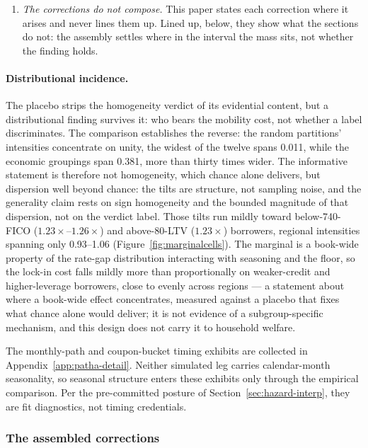 \begin{enumerate}
\item \emph{The corrections do not compose.} This paper states each correction where it arises and never lines them up. Lined up, below, they show what the sections do not: the assembly settles where in the interval the mass sits, not whether the finding holds.

\end{enumerate}

\paragraph{Distributional incidence.} The placebo strips the homogeneity verdict of its evidential content, but a distributional finding survives it: who bears the mobility cost, not whether a label discriminates. The comparison establishes the reverse: the random partitions' intensities concentrate on unity, the widest of the twelve spans 0.011, while the economic groupings span 0.381, more than thirty times wider. The informative statement is therefore not homogeneity, which chance alone delivers, but dispersion well beyond chance: the tilts are structure, not sampling noise, and the generality claim rests on sign homogeneity and the bounded magnitude of that dispersion, not on the verdict label. Those tilts run mildly toward below-740-FICO ($1.23\times$--$1.26\times$) and above-80-LTV ($1.23\times$) borrowers, regional intensities spanning only 0.93--1.06 (Figure~\ref{fig:marginalcells}). The marginal is a book-wide property of the rate-gap distribution interacting with seasoning and the floor, so the lock-in cost falls mildly more than proportionally on weaker-credit and higher-leverage borrowers, close to evenly across regions --- a statement about where a book-wide effect concentrates, measured against a placebo that fixes what chance alone would deliver; it is not evidence of a subgroup-specific mechanism, and this design does not carry it to household welfare.

The monthly-path and coupon-bucket timing exhibits are collected in Appendix~\ref{app:patha-detail}. Neither simulated leg carries calendar-month seasonality, so seasonal structure enters these exhibits only through the empirical comparison. Per the pre-committed posture of Section~\ref{sec:hazard-interp}, they are fit diagnostics, not timing credentials.

\subsubsection{The assembled corrections}

